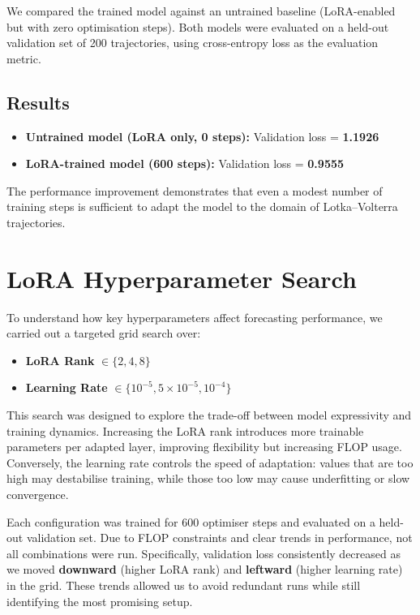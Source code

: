 \documentclass[a4paper,12pt]{article}
\begin{document}
We compared the trained model against an untrained baseline (LoRA-enabled but with zero optimisation steps). Both models were evaluated on a held-out validation set of 200 trajectories, using cross-entropy loss as the evaluation metric.

\subsection*{Results}

\begin{itemize}
    \item \textbf{Untrained model (LoRA only, 0 steps):} Validation loss = \textbf{1.1926}
    \item \textbf{LoRA-trained model (600 steps):} Validation loss = \textbf{0.9555}
\end{itemize}

The performance improvement demonstrates that even a modest number of training steps is sufficient to adapt the model to the domain of Lotka–Volterra trajectories.

\section{LoRA Hyperparameter Search}

To understand how key hyperparameters affect forecasting performance, we carried out a targeted grid search over:
\begin{itemize}
    \item \textbf{LoRA Rank} $\in \{2, 4, 8\}$
    \item \textbf{Learning Rate} $\in \{10^{-5}, 5 \times 10^{-5}, 10^{-4}\}$
\end{itemize}

This search was designed to explore the trade-off between model expressivity and training dynamics. Increasing the LoRA rank introduces more trainable parameters per adapted layer, improving flexibility but increasing FLOP usage. Conversely, the learning rate controls the speed of adaptation: values that are too high may destabilise training, while those too low may cause underfitting or slow convergence.

Each configuration was trained for 600 optimiser steps and evaluated on a held-out validation set. Due to FLOP constraints and clear trends in performance, not all combinations were run. Specifically, validation loss consistently decreased as we moved \textbf{downward} (higher LoRA rank) and \textbf{leftward} (higher learning rate) in the grid. These trends allowed us to avoid redundant runs while still identifying the most promising setup.
\end{document}

